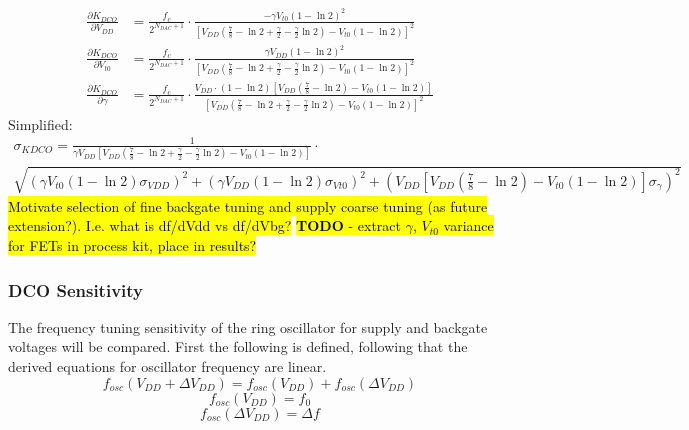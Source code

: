 		\begin{align}
			\frac{\partial K_{DCO}}{\partial V_{DD}} &= \frac{f_c}{2^{N_{DAC}+1}}\cdot\frac{-\gamma V_{t0}(1-\ln2)^2}{\left[ V_{DD}\left(\frac{7}{8}-\ln2+\frac{\gamma}{2}-\frac{\gamma}{2}\ln2\right)-V_{t0}\left(1-\ln2\right) \right]^2}\\
			\frac{\partial K_{DCO}}{\partial V_{t0}} &= \frac{f_c}{2^{N_{DAC}+1}}\cdot\frac{\gamma V_{DD}(1-\ln2)^2}{\left[ V_{DD}\left(\frac{7}{8}-\ln2+\frac{\gamma}{2}-\frac{\gamma}{2}\ln2\right)-V_{t0}\left(1-\ln2\right) \right]^2}\\
			\frac{\partial K_{DCO}}{\partial \gamma} &= \frac{f_c}{2^{N_{DAC}+1}}\cdot\frac{V_{DD}\cdot(1-\ln2) \left[ V_{DD}\left(\frac{7}{8}-\ln2\right)-V_{t0}\left(1-\ln2\right) \right]}{\left[ V_{DD}\left(\frac{7}{8}-\ln2+\frac{\gamma}{2}-\frac{\gamma}{2}\ln2\right)-V_{t0}\left(1-\ln2\right) \right]^2}
		\end{align}
		Simplified:
		\begin{multline}
			\sigma_{KDCO} = \frac{1}{\gamma V_{DD} \left[ V_{DD}\left(\frac{7}{8}-\ln2+\frac{\gamma}{2}-\frac{\gamma}{2}\ln2\right)-V_{t0}\left(1-\ln2\right) \right]}\cdot\\ \sqrt{\left(\gamma V_{t0} (1-\ln2)\sigma_{VDD} \right)^2 + \left(\gamma V_{DD} (1-\ln2)\sigma_{Vt0} \right)^2 + \left( V_{DD}\left[ V_{DD}\left(\frac{7}{8}-\ln2\right)-V_{t0}\left(1-\ln2\right) \right]\sigma_{\gamma} \right)^2 }
		\end{multline}		
		\hl{Motivate selection of fine backgate tuning and supply coarse tuning (as future extension?). I.e. what is df/dVdd vs df/dVbg?}
		\hl{\textbf{TODO} - extract $\gamma$, $V_{t0}$ variance for FETs in process kit, place in results?}
		\subsubsection{DCO Sensitivity}
		The frequency tuning sensitivity of the ring oscillator for supply and backgate voltages will be compared. First the following is defined, following that the derived equations for oscillator frequency are linear.
		\begin{equation}
			f_{osc}(V_{DD}+\Delta V_{DD}) = f_{osc}(V_{DD}) + f_{osc}(\Delta V_{DD})
		\end{equation}
		\begin{equation}
			f_{osc}(V_{DD}) = f_0
		\end{equation}
		\begin{equation}
			f_{osc}(\Delta V_{DD}) = \Delta f
		\end{equation}

